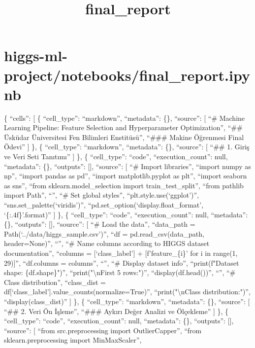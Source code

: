\documentclass[11pt]{article}
\title{final\_report}
\begin{document}
    
    \maketitle
    
    

    
    \section{higgs-ml-project/notebooks/final\_report.ipynb}\label{higgs-ml-projectnotebooksfinal_report.ipynb}

\{ ``cells'': {[} \{ ``cell\_type'': ``markdown'', ``metadata'': \{\},
``source'': {[} ``\# Machine Learning Pipeline: Feature Selection and
Hyperparameter Optimization\n'', ``\#\# Üsküdar Üniversitesi Fen
Bilimleri Enstitüsü\n'', ``\#\#\# Makine Öğrenmesi Final Ödevi'' {]} \},
\{ ``cell\_type'': ``markdown'', ``metadata'': \{\}, ``source'': {[}
``\#\# 1. Giriş ve Veri Seti Tanıtımı'' {]} \}, \{ ``cell\_type'':
``code'', ``execution\_count'': null, ``metadata'': \{\}, ``outputs'':
{[}{]}, ``source'': {[} ``\# Import libraries\n'', ``import numpy as
np\n'', ``import pandas as pd\n'', ``import matplotlib.pyplot as
plt\n'', ``import seaborn as sns\n'', ``from sklearn.model\_selection
import train\_test\_split\n'', ``from pathlib import Path\n'', ``\n'',
``\# Set global styles\n'', ``plt.style.use(`ggplot')\n'',
``sns.set\_palette(`viridis')\n'',
``pd.set\_option(`display.float\_format', `\{:.4f\}'.format)'' {]} \},
\{ ``cell\_type'': ``code'', ``execution\_count'': null, ``metadata'':
\{\}, ``outputs'': {[}{]}, ``source'': {[} ``\# Load the data\n'',
``data\_path = Path(`../data/higgs\_sample.csv')\n'', ``df =
pd.read\_csv(data\_path, header=None)\n'', ``\n'', ``\# Name columns
according to HIGGS dataset documentation\n'', ``columns =
{[}`class\_label'{]} + {[}f'feature\_\{i\}' for i in range(1,
29){]}\n'', ``df.columns = columns\n'', ``\n'', ``\# Display dataset
info\n'', ``print(f"Dataset shape: \{df.shape\}")\n'',
``print("\textbackslash nFirst 5 rows:")\n'', ``display(df.head())\n'',
``\n'', ``\# Class distribution\n'', ``class\_dist =
df{[}`class\_label'{]}.value\_counts(normalize=True)\n'',
``print("\textbackslash nClass distribution:")\n'',
``display(class\_dist)'' {]} \}, \{ ``cell\_type'': ``markdown'',
``metadata'': \{\}, ``source'': {[} ``\#\# 2. Veri Ön İşleme\n'',
``\#\#\# Aykırı Değer Analizi ve Ölçekleme'' {]} \}, \{ ``cell\_type'':
``code'', ``execution\_count'': null, ``metadata'': \{\}, ``outputs'':
{[}{]}, ``source'': {[} ``from src.preprocessing import
OutlierCapper\n'', ``from sklearn.preprocessing import MinMaxScaler\n'',
\end{document}
